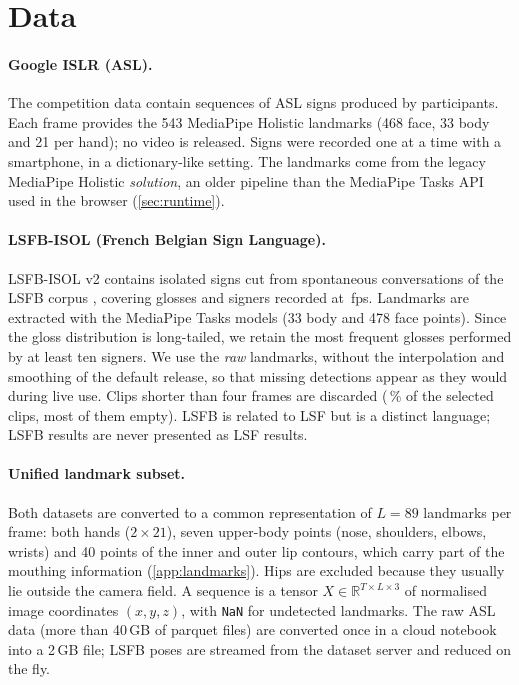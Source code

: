 \section{Data}
\label{sec:data}

\begin{table}[t]
  \centering
  \caption{Datasets after conversion to the unified format. Durations are medians; ``no hand'' is
  the share of frames in which neither hand is detected.}
  \label{tab:datasets}
  \small
  
\end{table}

\paragraph{Google ISLR (ASL).}
The competition data \citep{kaggle_islr} contain \numAslSamples{} sequences of \numAslClasses{} ASL
signs produced by \numAslSigners{} participants. Each frame provides the 543 MediaPipe Holistic
landmarks (468 face, 33 body and 21 per hand); no video is released. Signs were recorded one at a
time with a smartphone, in a dictionary-like setting. The landmarks come from the legacy MediaPipe
Holistic \emph{solution}, an older pipeline than the MediaPipe Tasks API used in the browser
(\cref{sec:runtime}).

\paragraph{LSFB-ISOL (French Belgian Sign Language).}
LSFB-ISOL v2 \citep{fink2021lsfb} contains \numLsfbAllInstances{} isolated signs cut from
spontaneous conversations of the LSFB corpus \citep{meurant2015corpus}, covering
\numLsfbAllGlosses{} glosses and \numLsfbAllSigners{} signers recorded at \numLsfbFps{}\,fps.
Landmarks are extracted with the MediaPipe Tasks models (33 body and 478 face points). Since the
gloss distribution is long-tailed, we retain the \numLsfbClasses{} most frequent glosses performed
by at least ten signers. We use the \emph{raw} landmarks, without the interpolation and smoothing
of the default release, so that missing detections appear as they would during live use. Clips
shorter than four frames are discarded (\numLsfbDroppedPct{}\,\% of the selected clips, most of
them empty). LSFB is related to LSF but is a distinct language; LSFB results are never presented
as LSF results.

\paragraph{Unified landmark subset.}
Both datasets are converted to a common representation of $L=89$ landmarks per frame: both hands
($2\times21$), seven upper-body points (nose, shoulders, elbows, wrists) and 40 points of the inner
and outer lip contours, which carry part of the mouthing information (\cref{app:landmarks}). Hips
are excluded because they usually lie outside the camera field. A sequence is a tensor
$X\in\mathbb{R}^{T\times L\times 3}$ of normalised image coordinates $(x,y,z)$, with \texttt{NaN}
for undetected landmarks. The raw ASL data (more than 40\,GB of parquet files) are converted once
in a cloud notebook into a 2\,GB file; LSFB poses are streamed from the dataset server and reduced
on the fly.

